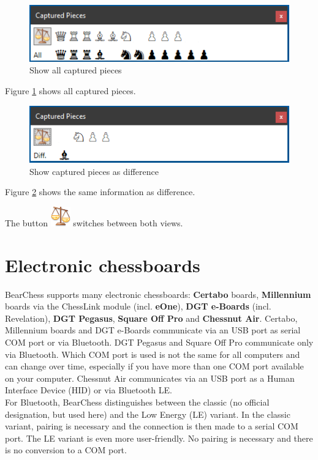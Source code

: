 \documentclass[11pt,a4paper]{article}
\begin{document}
\begin{figure}[H]
	\centering
	\includegraphics[scale=1.0]{CapturedPieces3.png}
	\caption{Show all captured pieces }
	\label{fig:CapturedPieces3}
\end{figure}

Figure \ref{fig:CapturedPieces3} shows all captured pieces.

\begin{figure}[H]
	\centering
	\includegraphics[scale=1.0]{CapturedPieces4.png}
	\caption{Show captured pieces as difference}
	\label{fig:CapturedPieces4}
\end{figure}
Figure \ref{fig:CapturedPieces4} shows the same information as difference.

The button \includegraphics[scale=0.5]{balance_unbalance.png} switches between both views.


\section{Electronic chessboards} \label{ElectronicChessBoard}
BearChess supports many electronic chessboards: \textbf{Certabo} boards, \textbf{Millennium} boards via the ChessLink module (incl. \textbf{eOne}), \textbf{DGT e-Boards} (incl. Revelation), \textbf{DGT Pegasus}, \textbf{Square Off Pro} and \textbf{Chessnut Air}. Certabo, Millennium boards and DGT e-Boards communicate via an USB port as serial COM port or via Bluetooth. DGT Pegasus and Square Off Pro communicate only via Bluetooth. Which COM port is used is not the same for all computers and can change over time, especially if you have more than one COM port available on your computer. Chessnut Air communicates via an USB port as a Human Interface Device (HID) or via Bluetooth LE.\\ 
For Bluetooth, BearChess distinguishes between the classic (no official designation, but used here) and the Low Energy (LE) variant.
In the classic variant, pairing is necessary and the connection is then made to a serial COM port. The LE variant is even more user-friendly. No pairing is necessary and there is no conversion to a COM port.
\end{document}
